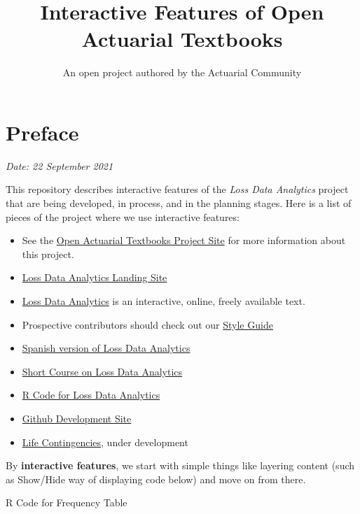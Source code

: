 \documentclass[
]{book}
\title{Interactive Features of Open Actuarial Textbooks}
\author{An open project authored by the Actuarial Community}
\date{}
\providecommand{\tightlist}{%
  \setlength{\itemsep}{0pt}\setlength{\parskip}{0pt}}
\begin{document}
\maketitle

{
\setcounter{tocdepth}{2}
\tableofcontents
}
\hypertarget{preface}{%
\chapter*{Preface}\label{preface}}

\emph{Date: 22 September 2021}

This repository describes interactive features of the \emph{Loss Data Analytics} project that are being developed, in process, and in the planning stages. Here is a list of pieces of the project where we use interactive features:

\begin{itemize}
\tightlist
\item
  See the \href{https://sites.google.com/a/wisc.edu/loss-data-analytics/}{Open Actuarial Textbooks Project Site} for more information about this project.
\item
  \href{https://openacttexts.github.io/}{Loss Data Analytics Landing Site}
\item
  \href{https://openacttexts.github.io/Loss-Data-Analytics/index.html}{Loss Data Analytics} is an interactive, online, freely available text.
\item
  Prospective contributors should check out our \href{https://OpenActTexts.github.io/StyleGuideLDA/index.html}{Style Guide}
\item
  \href{https://openacttexts.github.io/LDASpanish/}{Spanish version of Loss Data Analytics}
\item
  \href{https://openacttexts.github.io/LDACourse1/}{Short Course on Loss Data Analytics}
\item
  \href{https://openacttexts.github.io/LDARcode}{R Code for Loss Data Analytics}
\item
  \href{https://github.com/OpenActTextDev}{Github Development Site}
\item
  \href{https://openacttextdev.github.io/LifeCon/}{Life Contingencies}, under development
\end{itemize}

By \textbf{interactive features}, we start with simple things like layering content (such as Show/Hide way of displaying code below) and move on from there.

R Code for Frequency Table
\end{document}

